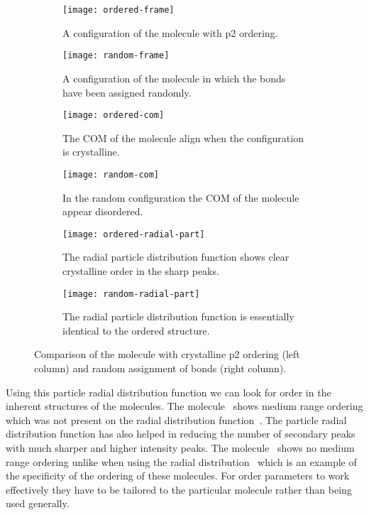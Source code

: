 \begin{figure}
    \begin{subfigure}[t]{0.5\linewidth}
        \texttt{[image: ordered-frame]}
        \caption{A configuration of the \dcon molecule with p2 ordering.}
        \label{fig:ordered frame}
    \end{subfigure}
    \begin{subfigure}[t]{0.5\linewidth}
        \texttt{[image: random-frame]}
        \caption{A configuration of the \dcon molecule in which the bonds have been assigned randomly.}
        \label{fig:random frame}
    \end{subfigure}
    \begin{subfigure}[t]{0.5\linewidth}
        \texttt{[image: ordered-com]}
        \caption{The COM of the \dcon molecule align when the configuration is crystalline.}
        \label{fig:ordered com}
    \end{subfigure}
    \begin{subfigure}[t]{0.5\linewidth}
        \texttt{[image: random-com]}
        \caption{In the random configuration the COM of the \dcon molecule appear disordered.}
        \label{fig:random com}
    \end{subfigure}
    \begin{subfigure}[t]{0.5\linewidth}
        \texttt{[image: ordered-radial-part]}
        \caption{The radial particle distribution function shows clear crystalline order in the sharp peaks.}
        \label{fig:ordered radial part}
    \end{subfigure}
    \begin{subfigure}[t]{0.5\linewidth}
        \texttt{[image: random-radial-part]}
        \caption{The radial particle distribution function is essentially identical to the ordered structure.}
        \label{fig:random radial part}
    \end{subfigure}
    \caption{Comparison of the \scon molecule with crystalline p2 ordering (left column) and random assignment of bonds (right column).}
    \label{fig:compact bonds}
\end{figure}


Using this particle radial distribution function we can look for order in the inherent structures of the molecules. The \dcon molecule~ shows medium range ordering which was not present on the radial distribution function~. The particle radial distribution function has also helped in reducing the number of secondary peaks with much sharper and higher intensity peaks. The \done molecule~ shows no medium range ordering unlike when using the radial distribution~ which is an example of the specificity of the ordering of these molecules. For order parameters to work effectively they have to be tailored to the particular molecule rather than being used generally.

